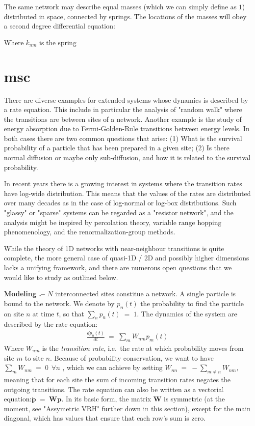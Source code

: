 The same network may describe equal masses (which 
we can simply define as $1$) distributed in space,
connected by springs. The locations of the masses will
obey a second degree differential equation:

%
%
Where $k_{nm}$ is the spring 


\section{msc}

There are diverse examples for extended systems whose dynamics is described by a rate equation. This include in particular the analysis of "random walk" where the transitions are between sites of a network. Another example is the study of energy absorption due to Fermi-Golden-Rule transitions between energy levels. In both cases there are two common questions that arise: (1) What is the survival probability of a particle  that has been prepared in a given site; (2) Is there normal diffusion or maybe only sub-diffusion, and how it is related to the survival probability.

In recent years there is a growing interest in systems where the transition rates have log-wide distribution. This means that the values of the rates
are distributed over many decades as in the case of log-normal or log-box distributions. Such "glassy" or "sparse" systems can be regarded as a "resistor network", and the analysis might be inspired by percolation theory, variable range hopping phenomenology, and the renormalization-group methods.

While the theory of 1D networks with near-neighbour transitions is quite complete, the more general case of quasi-1D / 2D and possibly higher dimensions lacks a unifying framework, and there are numerous open questions that we would like to study as outlined below.

{ \bf Modeling .-- } $N$ interconnected sites constitue a network. A single particle is bound to the network. We denote by $p_n(t)$ the probability to find the particle on site $n$ at time $t$, so that $\sum_n p_n(t) \;=\;1$. The dynamics of the system are described by the rate equation:
\begin{align}
\frac{dp_n(t)}{dt} \;=\; \sum_m W_{nm}p_m(t)
\end{align}
Where $W_{nm}$ is the \emph{transition rate}, i.e.\ the rate at which probability moves from site $m$ to site $n$.
Because of probability conservation, we want to have $\sum_m W_{nm} \;=\; 0 \ \ \forall n$ , which we can achieve by setting $W_{nn} \;=\; -\sum_{m\ne n} W_{nm} $, meaning that for each site the sum of incoming transition rates negates the outgoing transitions.
The rate equation can also be written as a vectorial equation:$\boldsymbol{ \dot p } \;=\; \boldsymbol{W} \boldsymbol{p}$. In its basic form, the matrix $\boldsymbol{W}$ is symmetric (at the moment, see "Assymetric VRH" further down in this section), except for the main diagonal, which has values that ensure that each row's sum is zero.

